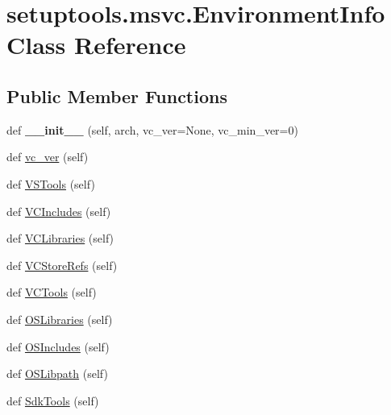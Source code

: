\hypertarget{classsetuptools_1_1msvc_1_1_environment_info}{}\section{setuptools.\+msvc.\+Environment\+Info Class Reference}
\label{classsetuptools_1_1msvc_1_1_environment_info}
\subsection*{Public Member Functions}
\begin{DoxyCompactItemize}
\item 
\mbox{\label{classsetuptools_1_1msvc_1_1_environment_info_aadd626f118e5f34282667e8abf966a1f}} 
def {\bfseries \+\_\+\+\_\+init\+\_\+\+\_\+} (self, arch, vc\+\_\+ver=None, vc\+\_\+min\+\_\+ver=0)
\item 
def \hyperlink{classsetuptools_1_1msvc_1_1_environment_info_aa769874f258713a660628e8e8abf92d0}{vc\+\_\+ver} (self)
\item 
def \hyperlink{classsetuptools_1_1msvc_1_1_environment_info_a942785692dbd53f81650af2a9c18e0ff}{V\+S\+Tools} (self)
\item 
def \hyperlink{classsetuptools_1_1msvc_1_1_environment_info_a01956a4af56037f7bc86f061ca57ed59}{V\+C\+Includes} (self)
\item 
def \hyperlink{classsetuptools_1_1msvc_1_1_environment_info_a801f70fc7fcfdee61534e8ffa5153eb2}{V\+C\+Libraries} (self)
\item 
def \hyperlink{classsetuptools_1_1msvc_1_1_environment_info_ae133809f045deeb9edfa3641ddeda5fd}{V\+C\+Store\+Refs} (self)
\item 
def \hyperlink{classsetuptools_1_1msvc_1_1_environment_info_a564e72c39cd5aced619098af952cca3d}{V\+C\+Tools} (self)
\item 
def \hyperlink{classsetuptools_1_1msvc_1_1_environment_info_a30bd88ece6b2e0a18d05a4f746a1ba2f}{O\+S\+Libraries} (self)
\item 
def \hyperlink{classsetuptools_1_1msvc_1_1_environment_info_a5dd42b70389abbceecb4675fa4669cd7}{O\+S\+Includes} (self)
\item 
def \hyperlink{classsetuptools_1_1msvc_1_1_environment_info_ac0bfd6c2e533ac3db2b4fb30feb97349}{O\+S\+Libpath} (self)
\item 
def \hyperlink{classsetuptools_1_1msvc_1_1_environment_info_acb23a9749e0fe111972811bf363d4d06}{Sdk\+Tools} (self)

\end{DoxyCompactItemize}
